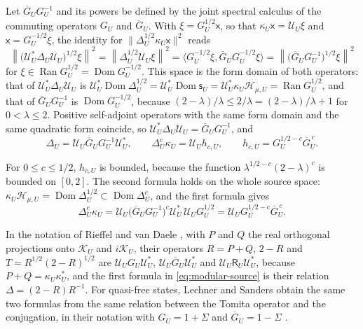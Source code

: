 \documentclass[11pt]{amsart}
\numberwithin{equation}{section}
\theoremstyle{definition}
\newcommand{\Hh}{\mathcal H}
\newcommand{\Res}{\mathsf R}
\newcommand{\sx}{\mathsf x}
\newcommand{\Ran}{\operatorname{Ran}}
\newcommand{\Dom}{\operatorname{Dom}}
\newcommand{\norm}[1]{\left\|#1\right\|}
\newcommand{\ip}[2]{\langle #1,#2\rangle}
\begin{document}
Let
\(\overline G_UG_U^{-1}\) and its powers be defined by the joint
spectral calculus of the commuting operators \(G_U\) and
\(\overline G_U\). With \(\xi=G_U^{1/2}\sx\), so that
\(\kappa_U\sx=\mathcal U_U\xi\) and \(\sx=G_U^{-1/2}\xi\), the identity for
\(\lVert\Delta_U^{1/2}\kappa_U\sx\rVert^2\) reads
\[
 \norm{\bigl(\mathcal U_U^*\Delta_U\mathcal U_U\bigr)^{1/2}\xi}^2
 =\norm{\Delta_U^{1/2}\mathcal U_U\xi}^2
 =\ip{G_U^{-1/2}\xi}{\overline G_UG_U^{-1/2}\xi}
 =\norm{\bigl(\overline G_UG_U^{-1}\bigr)^{1/2}\xi}^2
\]
for \(\xi\in\Ran G_U^{1/2}=\Dom G_U^{-1/2}\).
This space is the form domain of both operators: that of
\(\mathcal U_U^*\Delta_U\mathcal U_U\) is
\(\mathcal U_U^*\Dom\Delta_U^{1/2}=\mathcal U_U^*\Dom\mathsf s_U
=\mathcal U_U^*\kappa_U\Hh_{\mu,U}=\Ran G_U^{1/2}\), and that of
\(\overline G_UG_U^{-1}\) is \(\Dom G_U^{-1/2}\), because
\((2-\lambda)/\lambda\le2/\lambda=(2-\lambda)/\lambda+1\) for
\(0<\lambda\le2\). Positive self-adjoint operators with the same form
domain and the same quadratic form coincide, so
\(\mathcal U_U^*\Delta_U\mathcal U_U=\overline G_UG_U^{-1}\), and
\begin{equation}
 \Delta_U=\mathcal U_U\overline G_UG_U^{-1}\mathcal U_U^*,
 \qquad
 \Delta_U^c\kappa_U=\mathcal U_Uh_{c,U},
 \qquad
 h_{c,U}=G_U^{1/2-c}\overline G_U^{\,c}.
 \label{eq:modular-source}
\end{equation}

For \(0\le c\le1/2\), \(h_{c,U}\) is bounded, because the function
\(\lambda^{1/2-c}(2-\lambda)^c\) is bounded on \([0,2]\). The second formula holds on the whole source
space: \(\kappa_U\Hh_{\mu,U}=\Dom\Delta_U^{1/2}\subset\Dom\Delta_U^c\),
and the first formula gives
\[
 \Delta_U^c\kappa_U
 =\mathcal U_U\bigl(\overline G_UG_U^{-1}\bigr)^c\mathcal U_U^*\,
  \mathcal U_UG_U^{1/2}
 =\mathcal U_UG_U^{1/2-c}\overline G_U^{\,c}.
\]

In the notation of Rieffel and van Daele
\cite[Sections~2 and~3]{RvD77}, with \(P\) and \(Q\) the real orthogonal
projections onto \(\mathcal K_U\) and \(i\mathcal K_U\), their operators
\(R=P+Q\), \(2-R\) and \(T=R^{1/2}(2-R)^{1/2}\) are
\(\mathcal U_UG_U\mathcal U_U^*\), \(\mathcal U_U\overline G_U\mathcal U_U^*\)
and \(\mathcal U_U\Res_U\mathcal U_U^*\), because
\(P+Q=\kappa_U\kappa_U^*\), and the first formula in
\eqref{eq:modular-source} is their relation \(\Delta=(2-R)R^{-1}\).
For quasi-free states, Lechner and Sanders obtain the same two formulas
from the same relation between the Tomita operator and the conjugation,
in their notation with \(G_U=1+\Sigma\) and \(\overline G_U=1-\Sigma\)
\cite[Proposition~5.2 and the proof of Proposition~5.3]{LS16}.
\end{document}

